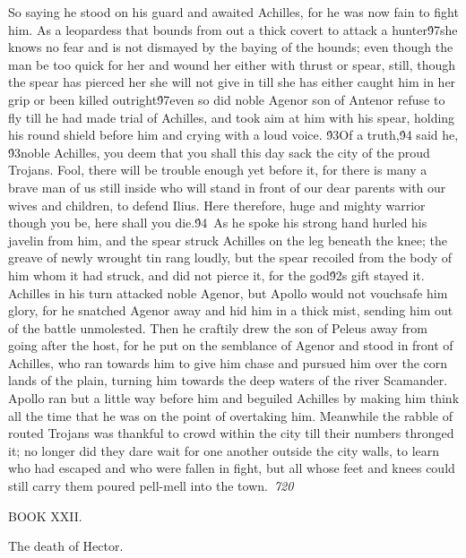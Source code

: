 {So saying he stood on his guard and awaited Achilles, for he was now fain to fight him. As a leopardess that bounds from out a thick covert to attack a hunter\'97she knows no fear and is not dismayed by the baying of the hounds; even though the man be too quick for her and wound her either with thrust or spear, still, though the spear has pierced her she will not give in till she has either caught him in her grip or been killed outright\'97even so did noble Agenor son of Antenor refuse to fly till he had made trial of Achilles, and took aim at him with his spear, holding his round shield before him and crying with a loud voice. \'93Of a truth,\'94 said he, \'93noble Achilles, you deem that you shall this day sack the city of the proud Trojans. Fool, there will be trouble enough yet before it, for there is many a brave man of us still inside who will stand in front of our dear parents with our wives and children, to defend Ilius. Here therefore, huge and mighty warrior though you be, here shall you die.\'94\
As he spoke his strong hand hurled his javelin from him, and the spear struck Achilles on the leg beneath the knee; the greave of newly wrought tin rang loudly, but the spear recoiled from the body of him whom it had struck, and did not pierce it, for the god\'92s gift stayed it. Achilles in his turn attacked noble Agenor, but Apollo would not vouchsafe him glory, for he snatched Agenor away and hid him in a thick mist, sending him out of the battle unmolested. Then he craftily drew the son of Peleus away from going after the host, for he put on the semblance of Agenor and stood in front of Achilles, who ran towards him to give him chase and pursued him over the corn lands of the plain, turning him towards the deep waters of the river Scamander. Apollo ran but a little way before him and beguiled Achilles by making him think all the time that he was on the point of overtaking him. Meanwhile the rabble of routed Trojans was thankful to crowd within the city till their numbers thronged it; no longer did they dare wait for one another outside the city walls, to learn who had escaped and who were fallen in fight, but all whose feet and knees could still carry them poured pell-mell into the town.\
\pard{}\sl720\qc{}

  BOOK XXII.\
\pard\pardeftab720\qj{}

\fs25\fsmilli12800 \cf2 The death of Hector.\
\pard{}\qj{}

}
